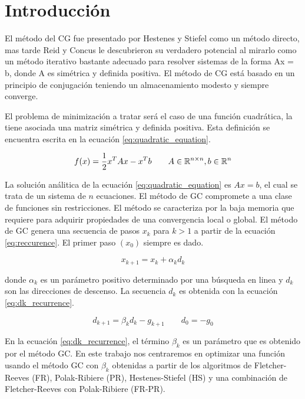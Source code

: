 \section{Introducción}

El método del CG fue presentado por Hestenes y Stiefel\cite{Hestenes_1952} como un método directo, mas tarde Reid\cite{Reid_1972} y Concus\cite{Concus_1976} le descubrieron su verdadero potencial al mirarlo como un método iterativo bastante adecuado para resolver sistemas de la forma Ax = b, donde A es simétrica y definida positiva. El método de CG está basado en un principio de conjugación teniendo un almacenamiento modesto y siempre converge.

El problema de minimización a tratar será el caso de una función cuadrática, la tiene asociada una matriz simétrica y definida positiva. Esta definición se encuentra escrita en la ecuación \ref{eq:quadratic_equation}.

\begin{equation}
    f(x) = \frac{1}{2}x^TAx -x^Tb \qquad A\in \mathbb{R}^{n\times n}, b\in \mathbb{R}^n
    \label{eq:quadratic_equation}
\end{equation}

La solución análitica de la ecuación \ref{eq:quadratic_equation} es $Ax=b$, el cual se trata de un sistema de $n$ ecuaciones. El método de GC compromete a una clase de funciones sin restricciones. El método se caracteriza por la baja memoria que requiere para adquirir propiedades de una convergencia local o global. El método de GC genera una secuencia de pasos $x_k$ para $k>1$ a partir de la ecuación \ref{eq:reccurence}. El primer paso $(x_0)$ siempre es dado.

\begin{equation}
    x_{k+1} = x_k + \alpha_k d_k \label{eq:reccurence}
\end{equation}

donde $\alpha_k$ es un parámetro positivo determinado por una búsqueda en linea y $d_k$ son las direcciones de descenso. La secuencia $d_k$ es obtenida con la ecuación \ref{eq:dk_recurrence}.

\begin{equation}
    d_{k+1} = \beta_k d_k  - g_{k+1}  \qquad d_0 = -g_0
    \label{eq:dk_recurrence}
\end{equation}

En la ecuación \ref{eq:dk_recurrence}, el término $\beta_k$ es un parámetro que es obtenido por el método GC. En este trabajo nos centraremos en optimizar una función usando el método GC con $\beta_k$ obtenidas a partir de los algoritmos de Fletcher-Reeves (FR), Polak-Ribiere (PR), Hestenes-Stiefel (HS) y una combinación de Fletcher-Reeves con Polak-Ribiere (FR-PR).

